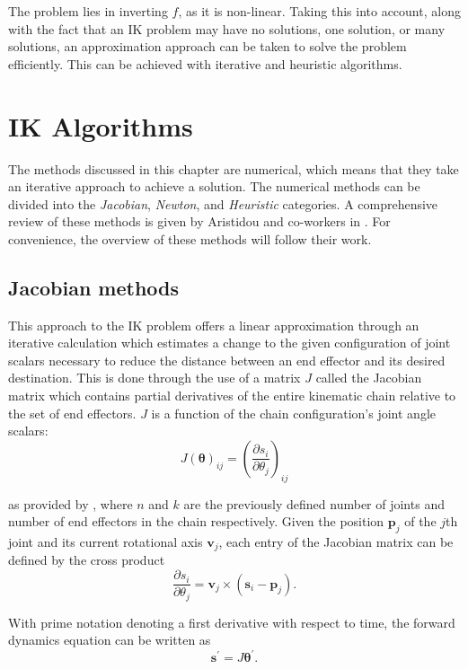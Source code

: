 The problem lies in inverting \(f\), as it is non-linear. Taking this into
account, along with the fact that an IK problem may have no solutions, one
solution, or many solutions, an approximation approach can be taken to solve
the problem efficiently. This can be achieved with iterative and heuristic
algorithms.

\section{IK Algorithms}
The methods discussed in this chapter are numerical, which means that
they take an iterative approach to achieve a solution. The numerical methods
can be divided into the \textit{Jacobian}, \textit{Newton}, and
\textit{Heuristic} categories. A comprehensive review of these methods is given
by Aristidou and co-workers in \cite{Aristidou:2018:IK_survey}. For convenience,
the overview of these methods will follow their work.

\subsection{Jacobian methods}
This approach to the IK problem \cite{BALESTRINO19842435, wolovich, Baillieul} offers
a linear approximation through an iterative calculation which estimates a change
to the given configuration of joint scalars necessary to reduce the distance
between an end effector and its desired destination. This is done through the
use of a matrix \(J\) called the Jacobian matrix which contains partial
derivatives of the entire kinematic chain relative to the set of end effectors.
\(J\) is a function of the chain configuration's joint angle scalars:
\begin{equation}
    J(\bm{\theta})_{ij} = \left(\frac{\partial s_i}{\partial
    \theta_j}\right)_{ij}
\end{equation}

\noindent as provided by \cite{rbuss_ik_survey}, where \(n\) and \(k\) are the
previously defined number of joints and number of end effectors in the chain
respectively. Given the position \(\mathbf{p}_j\) of the \(j\)th joint and its
current rotational axis \(\mathbf{v}_j\), each entry of the Jacobian matrix can
be defined by the cross product
\begin{equation}
    \frac{\partial s_i}{\partial \theta_j} = \mathbf{v}_j \times (\mathbf{s}_i
    - \mathbf{p}_j).
\end{equation}

With prime notation denoting a first derivative with respect to time, the
forward dynamics equation can be written as
\begin{equation}
    \mathbf{s}^\prime = J\bm{\theta}^\prime.
\end{equation}

